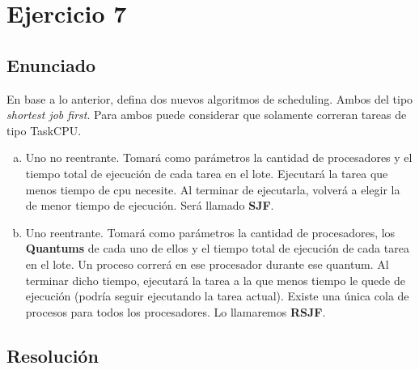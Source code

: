 \section{Ejercicio 7}

\subsection{Enunciado}
En base a lo anterior, defina dos nuevos algoritmos de scheduling. Ambos del tipo \textit{shortest job first}. Para ambos puede considerar que solamente correran tareas de tipo TaskCPU.

\begin{enumerate}[a)]
\item Uno no reentrante. Tomará como parámetros la cantidad de procesadores y el tiempo total de ejecución de cada tarea en el lote. Ejecutará la tarea que menos tiempo de cpu necesite. Al terminar de ejecutarla, volverá a elegir la de menor tiempo de ejecución.
Será llamado \textbf{SJF}.

\item Uno reentrante. Tomará como parámetros la cantidad de procesadores, los \textbf{Quantums} de cada uno de ellos y el tiempo total de ejecución de cada tarea en el lote. Un proceso correrá en ese procesador durante ese quantum. Al terminar dicho tiempo, ejecutará la tarea a la que menos tiempo le quede de ejecución (podría seguir ejecutando la tarea actual). Existe una única cola de procesos para todos los procesadores. Lo llamaremos
\textbf{RSJF}.
\end{enumerate}

\subsection{Resolución}